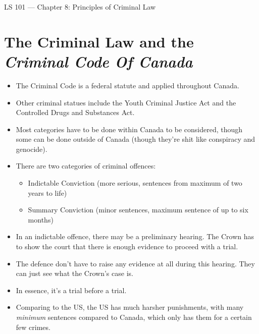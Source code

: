 \documentclass{article}
\author{Clement Tsang}
\begin{document}
\begin{center}
    \Large{LS 101 --- Chapter 8: Principles of Criminal Law}
\end{center}

\section{The Criminal Law and the \emph{Criminal Code Of Canada}}
\begin{itemize}
    \item The Criminal Code is a federal statute and applied throughout Canada.
    \item Other criminal statues include the Youth Criminal Justice Act and the Controlled Drugs and Substances Act.
    \item Most categories have to be done within Canada to be considered, though some can be done outside of Canada (though they're shit like conspiracy and genocide).
    \item There are two categories of criminal offences:
        \begin{itemize}
            \item Indictable Conviction (more serious, sentences from maximum of two years to life)
            \item Summary Conviction (minor sentences, maximum sentence of up to six months)
        \end{itemize}
    \item In an indictable offence, there may be a preliminary hearing.  The Crown has to show the court that there is enough evidence to proceed with a trial.
    \item The defence don't have to raise any evidence at all during this hearing.  They can just see what the Crown's case is.
    \item In essence, it's a trial before a trial.
    \item Comparing to the US, the US has much harsher punishments, with many \emph{minimum} sentences compared to Canada, which only has them for a certain few crimes.
\end{itemize}
\end{document}
